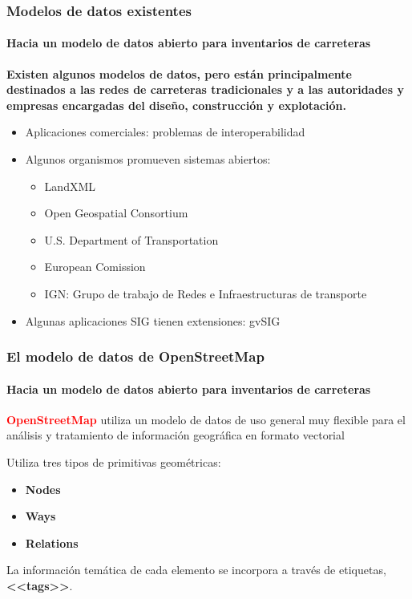 \documentclass[aspectratio = 169, 12pt]{beamer}
\begin{document}
\begin{frame}
	\frametitle{Modelos de datos existentes}
	\framesubtitle{Hacia un modelo de datos abierto para inventarios de carreteras}
	\textbf{Existen algunos modelos de datos, pero están principalmente destinados a las redes de carreteras tradicionales y a las autoridades y empresas encargadas del diseño, construcción y explotación.}

	\vspace{1em}
	\begin{itemize}
		\item Aplicaciones comerciales: problemas de interoperabilidad
		\item Algunos organismos promueven sistemas abiertos:
		\begin{itemize}
			\item LandXML
			\item Open Geospatial Consortium
			\item U.S. Department of Transportation
			\item European Comission
			\item IGN: Grupo de trabajo de Redes e Infraestructuras de transporte
		\end{itemize}
		\item Algunas aplicaciones SIG tienen extensiones: gvSIG
	\end{itemize}
\end{frame}


\begin{frame}
	\frametitle{El modelo de datos de OpenStreetMap}
	\framesubtitle{Hacia un modelo de datos abierto para inventarios de carreteras}

	\textcolor{red}{\textbf{OpenStreetMap}} utiliza un modelo de datos de uso general muy flexible para el análisis y tratamiento de información geográfica en formato vectorial

	\vspace{1.0em}
	\begin{figure}
	\end{figure}
	Utiliza tres tipos de primitivas geométricas:
	\begin{itemize}
		\item \textbf{Nodes}
		\item \textbf{Ways}
		\item \textbf{Relations}
	\end{itemize}

	\vspace{1em}
	La información temática de cada elemento se incorpora a través de etiquetas, \textbf{<<tags>>}.
\end{frame}
\end{document}
